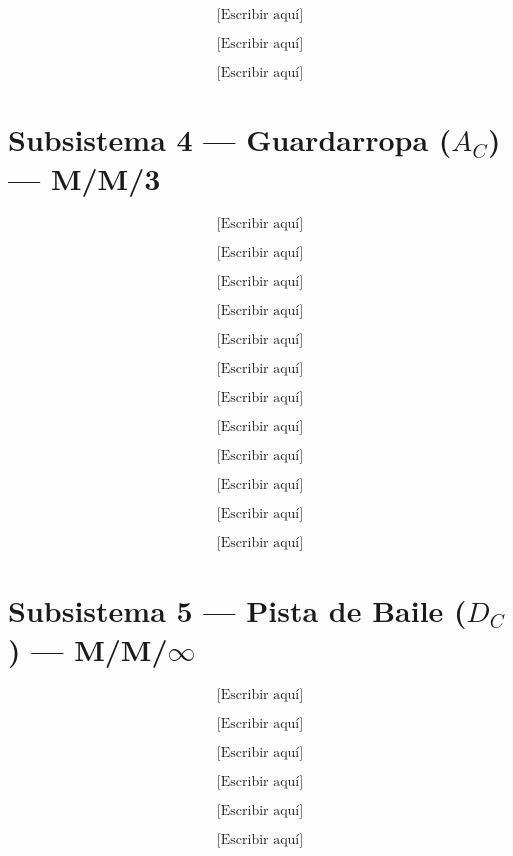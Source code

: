 \documentclass[12pt,a4paper]{article}
\begin{document}
\[
\text{[Escribir aquí]} \tag{3.10}
\]

\[
\text{[Escribir aquí]} \tag{3.11}
\]

\[
\text{[Escribir aquí]} \tag{3.12}
\]

\vspace{1cm}
\section*{Subsistema 4 — Guardarropa ($A_C$) — M/M/3}

\[
\text{[Escribir aquí]} \tag{4.1}
\]

\[
\text{[Escribir aquí]} \tag{4.2}
\]

\[
\text{[Escribir aquí]} \tag{4.3}
\]

\[
\text{[Escribir aquí]} \tag{4.4}
\]

\[
\text{[Escribir aquí]} \tag{4.5}
\]

\[
\text{[Escribir aquí]} \tag{4.6}
\]

\[
\text{[Escribir aquí]} \tag{4.7}
\]

\[
\text{[Escribir aquí]} \tag{4.8}
\]

\[
\text{[Escribir aquí]} \tag{4.9}
\]

\[
\text{[Escribir aquí]} \tag{4.10}
\]

\[
\text{[Escribir aquí]} \tag{4.11}
\]

\[
\text{[Escribir aquí]} \tag{4.12}
\]

\vspace{1cm}
\section*{Subsistema 5 — Pista de Baile ($D_C$) — M/M/$\infty$}

\[
\text{[Escribir aquí]} \tag{5.1}
\]

\[
\text{[Escribir aquí]} \tag{5.2}
\]

\[
\text{[Escribir aquí]} \tag{5.3}
\]

\[
\text{[Escribir aquí]} \tag{5.4}
\]

\[
\text{[Escribir aquí]} \tag{5.5}
\]

\[
\text{[Escribir aquí]} \tag{5.6}
\]
\end{document}
